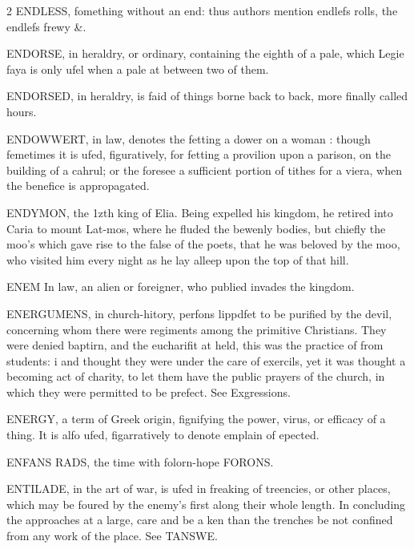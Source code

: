 \documentclass[10pt]{article}
\begin{document}
\begin{multicols}{2}\raggedcolumns
ENDLESS, fomething without an end: thus authors mention endlefs rolls, the endlefs frewy \&.

ENDORSE, in heraldry, or ordinary, containing the eighth of a pale, which Legie faya is only ufel when a pale at between two of them.

ENDORSED, in heraldry, is faid of things borne back to back, more finally called hours.

ENDOWWERT, in law, denotes the fetting a dower on a woman : though femetimes it is ufed, figuratively, for fetting a provilion upon a parison, on the building of a cahrul; or the foresee a sufficient portion of tithes for a viera, when the benefice is appropagated.

ENDYMON, the 1zth king of Elia. Being expelled his kingdom, he retired into Caria to mount Lat-mos, where he fluded the bewenly bodies, but chiefly the moo's which gave rise to the false of the poets, that he was beloved by the moo, who visited him every night as he lay alleep upon the top of that hill.

ENEM In law, an alien or foreigner, who publied invades the kingdom.

ENERGUMENS, in church-hitory, perfons lippdfet to be purified by the devil, concerning whom there were regiments among the primitive Christians. They were denied baptirn, and the eucharifit at held, this was the practice of from students: i and thought they were under the care of exercils, yet it was thought a becoming act of charity, to let them have the public prayers of the church, in which they were permitted to be prefect. See Exgressions.

ENERGY, a term of Greek origin, fignifying the power, virus, or efficacy of a thing. It is alfo ufed, figarratively to denote emplain of epected.

ENFANS RADS, the time with folorn-hope FORONS.

ENTILADE, in the art of war, is ufed in freaking of treencies, or other places, which may be foured by the enemy’s first along their whole length. In concluding the approaches at a large, care and be a ken than the trenches be not confined from any work of the place. See TANSWE.


\end{multicols}
\end{document}
